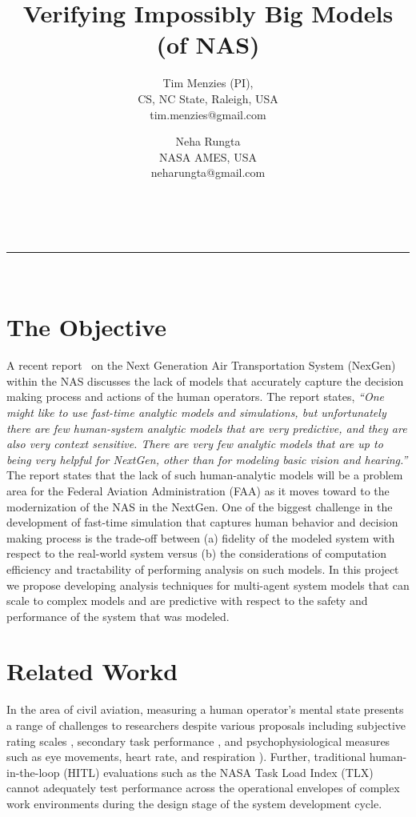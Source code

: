 \documentclass[12pt]{article}
\begin{document}
 
\vspace{-1cm}
\title{ Verifying Impossibly Big Models (of NAS)} 
\author{Tim Menzies (PI),\\
CS, NC State, Raleigh, USA\\
tim.menzies@gmail.com
\and
Neha Rungta\\
NASA AMES, USA\\
neharungta@gmail.com}
\date{}
\maketitle
\vspace{-0.75cm}
~\hrule~\newline

\section{The Objective}


A recent report~\cite{nrc:nextgen} on the Next Generation Air Transportation System (NexGen) within the NAS discusses the lack of models that accurately capture the decision making process and actions of the human operators. The report states, \emph{``One might like to use fast-time analytic models and simulations, but unfortunately there are few human-system analytic models that are very predictive, and they are also very context sensitive. There are very
few analytic models that are up to being very helpful for NextGen, other than for modeling basic vision and hearing.''} The report states that the lack of such human-analytic models will be a problem area for the Federal Aviation Administration (FAA) as it moves toward to the modernization of the NAS in the NextGen. One of the biggest challenge in the development of fast-time simulation that captures human behavior and decision making process is the trade-off between (a) fidelity of the modeled system with respect to the real-world system versus (b) the considerations of computation efficiency and tractability of performing analysis on such models. In this project we propose developing analysis techniques for multi-agent system models that can scale to complex models and are predictive with respect to the safety and performance of the system that was modeled. 


\section{Related Workd}

In the area of civil aviation, measuring a human operator's mental
state presents a range of challenges to researchers despite various
proposals including subjective rating scales \cite{NASATLX88},
secondary task performance \cite{DualTaskMethodology91}, and
psychophysiological measures such as eye movements, heart rate, and
respiration \cite{MetricsWorkloadKramer91}).  Further, traditional
hu\-man\--in\--the\--lo\-op (HI\-TL) evaluations such as the NASA Task
Load Index (TLX) cannot adequately test performance across the
operational envelopes of complex work environments during the design
stage of the system development cycle.
\end{document}
